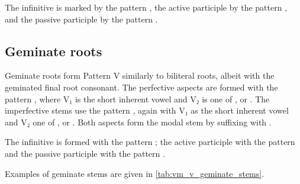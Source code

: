 \documentclass[grammar]{subfiles}
\begin{document}
The infinitive is marked by the pattern , the active participle
by the pattern , and the passive participle by the pattern
.  
 
 
\subsection{Geminate roots}
\label{ssec:vm_v_geminate_roots}

Geminate roots form Pattern V similarly to biliteral roots, albeit with the
geminated final root consonant. The perfective aspects are formed with the
pattern , where V₁ is the short inherent vowel and V₂ is one
of ,  or .  The imperfective stems use the pattern
, again with V₁ as the short inherent vowel and V₂ one of
,  or .  Both aspects form the modal stem by suffixing
with . 

The infinitive is formed with the pattern ; the active
participle with the pattern  and the passive participle with the
pattern . 

Examples of geminate stems are given in \cref{tab:vm_v_geminate_stems}. 

\begin{table}[h!]\small\capstart
  \centering
  \\
  \caption{Pattern V geminate stems \label{tab:vm_v_geminate_stems}}
\end{table}
\end{document}
